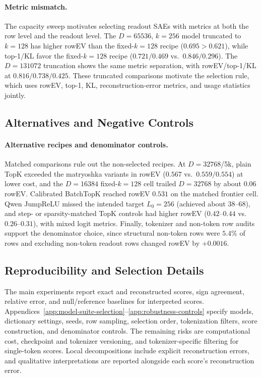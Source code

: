 \ReadoutSAEFloatBarrier

\paragraph{Metric mismatch.}
The capacity sweep motivates selecting readout SAEs with metrics at both the row level and
the readout level. The $D=65536$, $k=256$ model truncated to $k=128$ has
higher rowEV than the fixed-$k=128$ recipe ($0.695>0.621$), while top-1/KL favor
the fixed-$k=128$ recipe ($0.721/0.469$ vs.\ $0.846/0.296$). The $D=131072$
truncation shows the same metric separation, with rowEV/top-1/KL at
$0.816/0.738/0.425$. These truncated comparisons motivate the selection rule,
which uses rowEV, top-1, KL, reconstruction-error metrics, and usage statistics jointly.

\ReadoutSAEFloatBarrier
\subsection{Alternatives and Negative Controls}
\label{app:readout-factorizer-controls}

\paragraph{Alternative recipes and denominator controls.}
Matched comparisons rule out the non-selected recipes.
At $D=32768$/5k, plain TopK exceeded the matryoshka variants in rowEV
\citep{bussmann2025matryoshka} ($0.567$ vs.\ $0.559/0.554$) at lower cost, and
the $D=16384$ fixed-$k=128$ cell trailed $D=32768$ by about $0.06$ rowEV.
Calibrated BatchTopK \citep{bussmann2024batchtopk} reached rowEV $0.531$ on the
matched frontier cell. Qwen JumpReLU \citep{rajamanoharan2024jumprelu} missed
the intended target $L_0=256$ (achieved about $38$--$68$), and step- or
sparsity-matched TopK controls had higher rowEV ($0.42$--$0.44$ vs.\
$0.26$--$0.31$), with mixed logit metrics. Finally, tokenizer and non-token row
audits support the denominator choice, since structural non-token rows were $5.4\%$ of
rows and excluding non-token readout rows changed rowEV by $+0.0016$.

\subsection{Reproducibility and Selection Details}
\label{app:readout-factorizer-limitations}

The main experiments report exact and reconstructed scores, sign agreement,
relative error, and null/reference baselines for interpreted scores.
Appendices~\ref{app:model-suite-selection}--\ref{app:robustness-controls}
specify models, dictionary settings, seeds, row sampling, selection order,
tokenization filters, score construction, and denominator controls. The
remaining risks are computational cost, checkpoint and tokenizer versioning,
and tokenizer-specific filtering for single-token scores. Local decompositions
include explicit reconstruction errors, and qualitative
interpretations are reported alongside each score's reconstruction error.

